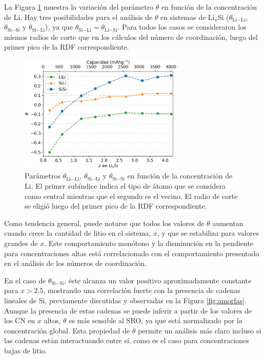 La Figura \ref{fig:sro} muestra la variación del parámetro $\theta$ en función 
de la concentración de Li. Hay tres posibilidades para el análisis de $\theta$ en
sistemas de Li$_x$Si ($\theta_{\text{Li}-\text{Li}}$, $\theta_{\text{Si}-\text{Si}}$ y $\theta_{\text{Si}-\text{Li}}$), ya
que $\theta_{\text{Si}-\text{Li}} = \theta_{\text{Li}-\text{Si}}$. Para todos los casos se consideraron los
mismos radios de corte que en los cálculos del número de coordinación, luego del
primer pico de la RDF correspondiente.
\begin{figure}[h!]
    \centering
    \includegraphics[width=0.7\textwidth]{Silicio/caracterizacion/resultados/sro/sro.png}
    \caption{Parámetros $\theta_{\text{Li}-\text{Li}}$, $\theta_{\text{Si}-\text{Li}}$ y $\theta_{\text{Si}-\text{Si}}$ 
    en función de la concentración de Li. El primer subíndice indica el tipo de
    átomo que se considera como central mientras que el segundo es el vecino. El
    radio de corte se eligió luego del primer pico de la RDF correspondiente.}
    \label{fig:sro}
\end{figure}

Como tendencia general, puede notarse que todos los valores de $\theta$ aumentan
cuando crece la cantidad de litio en el sistema, $x$, y que se estabiliza para 
valores grandes de $x$. Este comportamiento monótono y la disminución en la 
pendiente para concentraciones altas está correlacionado con el comportamiento
presentado en el análisis de los números de coordinación.

En el caso de $\theta_{\text{Si}-\text{Si}}$, éste alcanza un valor positivo aproximadamente 
constante para $x > 2.5$, mostrando una correlación fuerte con la presencia de 
cadenas lineales de Si, previamente discutidas y observadas en la Figura 
\ref{fig:amorfas}. Aunque la presencia de estas cadenas se puede inferir a partir
de los valores de los CN en $x$ altos, $\theta$ es más sensible al SRO, ya que
está normalizado por la concentración global. Esta propiedad de $\theta$ permite
un análisis más claro incluso si las cadenas están interactuando entre sí, como
es el caso para concentraciones bajas de litio.

